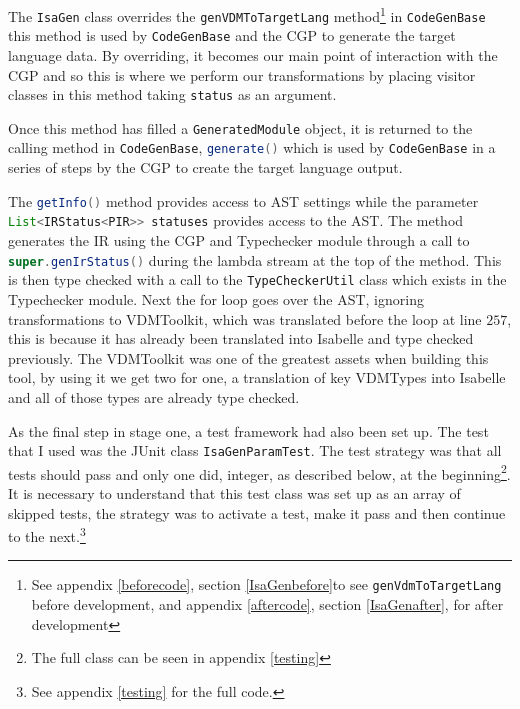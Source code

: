     The \lstinline[language=Java]{IsaGen} class overrides the \lstinline[language=Java]{genVDMToTargetLang} method\footnote{See appendix \ref{beforecode}, section \ref{IsaGenbefore}to see \lstinline[language=Java]{genVdmToTargetLang} before development, and appendix \ref{aftercode}, section \ref{IsaGenafter}, for after development} in \lstinline[language=Java]{CodeGenBase} this method is used by \lstinline[language=Java]{CodeGenBase} and the CGP to generate the target language data. By overriding, it becomes our main point of interaction with the CGP and so this is where we perform our transformations by placing visitor classes in this method taking \lstinline[language=Java]{status} as an argument. 

    Once this method has filled a \lstinline[language=Java]{GeneratedModule} object, it is returned to the calling method in \lstinline[language=Java]{CodeGenBase}, \lstinline[language=Java]{generate()} which is used by \lstinline[language=Java]{CodeGenBase} in a series of steps by the CGP to create the target language output.
   
	The \lstinline[language=Java]{getInfo()} method provides access to AST settings while the parameter \lstinline[language=Java]{List<IRStatus<PIR>> statuses} provides access to the AST. The method generates the IR using the CGP and Typechecker module through a call to \lstinline[language=Java]{super.genIrStatus()} during the lambda stream at the top of the method. This is then type checked with a call to the \lstinline[language=Java]{TypeCheckerUtil} class which exists in the Typechecker module. Next the for loop goes over the AST, ignoring transformations to VDMToolkit, which was translated before the loop at line $257$, this is because it has already been translated into Isabelle and type checked previously. The VDMToolkit was one of the greatest assets when building this tool, by using it we get two for one, a translation of key VDMTypes into Isabelle and all of those types are already type checked. 

	As the final step in stage one, a test framework had also been set up. The test that I used was the JUnit class \lstinline[language=Java]{IsaGenParamTest}. The test strategy was that all tests should pass and only one did, integer, as described below, at the beginning\footnote{The full class can be seen in appendix \ref{testing}}. It is necessary to understand that this test class was set up as an array of skipped tests, the strategy was to activate a test, make it pass and then continue to the next.\footnote{See appendix \ref{testing} for the full code.}

